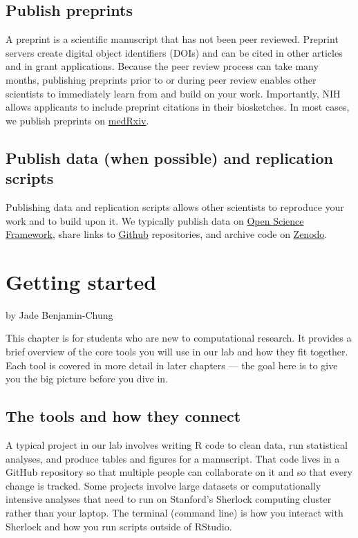 \documentclass[
]{book}
\begin{document}
\section{Publish preprints}\label{publish-preprints}

A preprint is a scientific manuscript that has not been peer reviewed. Preprint servers create digital object identifiers (DOIs) and can be cited in other articles and in grant applications. Because the peer review process can take many months, publishing preprints prior to or during peer review enables other scientists to immediately learn from and build on your work. Importantly, NIH allows applicants to include preprint citations in their biosketches. In most cases, we publish preprints on \href{https://www.medrxiv.org/}{medRxiv}.

\section{Publish data (when possible) and replication scripts}\label{publish-data-when-possible-and-replication-scripts}

Publishing data and replication scripts allows other scientists to reproduce your work and to build upon it. We typically publish data on \href{osf.io}{Open Science Framework}, share links to \href{github.com}{Github} repositories, and archive code on \href{zenodo.org}{Zenodo}.

\chapter{Getting started}\label{getting-started}

by Jade Benjamin-Chung

This chapter is for students who are new to computational research. It provides a brief overview of the core tools you will use in our lab and how they fit together. Each tool is covered in more detail in later chapters --- the goal here is to give you the big picture before you dive in.

\section{The tools and how they connect}\label{the-tools-and-how-they-connect}

A typical project in our lab involves writing R code to clean data, run statistical analyses, and produce tables and figures for a manuscript. That code lives in a GitHub repository so that multiple people can collaborate on it and so that every change is tracked. Some projects involve large datasets or computationally intensive analyses that need to run on Stanford's Sherlock computing cluster rather than your laptop. The terminal (command line) is how you interact with Sherlock and how you run scripts outside of RStudio.
\end{document}
